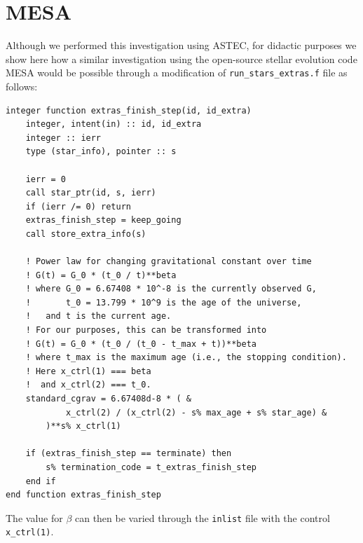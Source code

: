 \documentclass[twocolumn]{aastex63}
\begin{document}
\section{MESA}
Although we performed this investigation using ASTEC, for didactic purposes we show here how a similar investigation using the open-source stellar evolution code MESA \citep{2011ApJS..192....3P} would be possible through a modification of \verb|run_stars_extras.f| file as follows: 
\begin{verbatim}
integer function extras_finish_step(id, id_extra)
    integer, intent(in) :: id, id_extra
    integer :: ierr
    type (star_info), pointer :: s
    
    ierr = 0
    call star_ptr(id, s, ierr)
    if (ierr /= 0) return
    extras_finish_step = keep_going
    call store_extra_info(s)
    
    ! Power law for changing gravitational constant over time
    ! G(t) = G_0 * (t_0 / t)**beta
    ! where G_0 = 6.67408 * 10^-8 is the currently observed G,
    !       t_0 = 13.799 * 10^9 is the age of the universe,
    !   and t is the current age.
    ! For our purposes, this can be transformed into
    ! G(t) = G_0 * (t_0 / (t_0 - t_max + t))**beta
    ! where t_max is the maximum age (i.e., the stopping condition).
    ! Here x_ctrl(1) === beta
    !  and x_ctrl(2) === t_0.
    standard_cgrav = 6.67408d-8 * ( &
            x_ctrl(2) / (x_ctrl(2) - s% max_age + s% star_age) &
        )**s% x_ctrl(1)

    if (extras_finish_step == terminate) then
        s% termination_code = t_extras_finish_step
    end if
end function extras_finish_step
\end{verbatim}
The value for $\beta$ can then be varied through the \verb|inlist| file with the control \verb|x_ctrl(1)|. 
\fi
\end{document}
